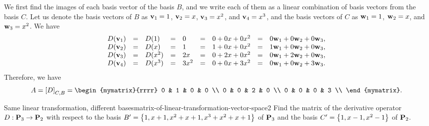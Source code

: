 \begin{solution}
  We first find the images of each basis vector of the basis $B$, and
  we write each of them as a linear combination of basis vectors from
  the basis $C$. Let us denote the basis vectors of $B$ as
  $\vect{v}_1 = 1$, $\vect{v}_2 = x$, $\vect{v}_3 = x^2$, and
  $\vect{v}_4=x^3$, and the basis vectors of $C$ as $\vect{w}_1 = 1$,
  $\vect{w}_2 = x$, and $\vect{w}_3 = x^2$. We have
  \begin{equation*}
    \begin{array}{rclclclcl}
      D(\vect{v}_1) &=& D(1) &=& 0 &=& 0 + 0x + 0x^2 &=& 0\vect{w}_1 + 0\vect{w}_2 + 0\vect{w}_3, \\
      D(\vect{v}_2) &=& D(x) &=& 1 &=& 1 + 0x + 0x^2 &=& 1\vect{w}_1 + 0\vect{w}_2 + 0\vect{w}_3, \\
      D(\vect{v}_3) &=& D(x^2) &=& 2x &=& 0 + 2x + 0x^2 &=& 0\vect{w}_1 + 2\vect{w}_2 + 0\vect{w}_3, \\
      D(\vect{v}_4) &=& D(x^3) &=& 3x^2 &=& 0 + 0x + 3x^2 &=& 0\vect{w}_1 + 0\vect{w}_2 + 3\vect{w}_3. \\
    \end{array}
  \end{equation*}
  Therefore, we have
  \begin{equation*}
    A=\coord{D}_{C,B} =
    \begin{mymatrix}{rrrr}
      0 & 1 & 0 & 0 \\
      0 & 0 & 2 & 0 \\
      0 & 0 & 0 & 3 \\
    \end{mymatrix}.
  \end{equation*}
\end{solution}

\begin{example}{Same linear transformation, different bases}{matrix-of-linear-transformation-vector-space2}
  Find the matrix of the derivative operator $D:\mathbf{P}_3\to\mathbf{P}_2$
  with respect to the basis $B'=\left\{1,x+1,x^2+x+1,x^3+x^2+x+1\right\}$ of
  $\mathbf{P}_3$ and the basis $C'=\left\{1,x-1,x^2-1\right\}$ of $\mathbf{P}_2$.
\end{example}

